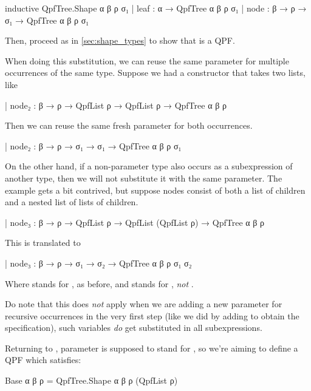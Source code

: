 \begin{leancode}
  inductive QpfTree.Shape α β ρ σ₁
    | leaf : α → QpfTree α β ρ σ₁
    | node : β → ρ → σ₁ → QpfTree α β ρ σ₁
\end{leancode}

Then, proceed as in \cref{sec:shape_types} to show that  is a QPF.\@

\begin{remark}
  When doing this substitution, we can reuse the same parameter for multiple occurrences of the same type.
  Suppose we had a constructor that takes two lists, like
  \begin{leancode}
    | node₂ : β → ρ → QpfList ρ → QpfList ρ → QpfTree α β ρ
  \end{leancode}
  Then we can reuse the same fresh parameter  for both occurrences.
  \begin{leancode}
    | node₂ : β → ρ → σ₁ → σ₁ → QpfTree α β ρ σ₁
  \end{leancode}
  
  On the other hand, if a non-parameter type also occurs as a subexpression of another type, then
  we will not substitute it with the same parameter.
  The example gets a bit contrived, but suppose nodes consist of both a list of children and a nested list 
  of lists of children.
  \begin{leancode}
    | node₃ : β → ρ → QpfList ρ → QpfList (QpfList ρ) → QpfTree α β ρ
  \end{leancode}
  This is translated to
  \begin{leancode}
    | node₃ : β → ρ → σ₁ → σ₂ → QpfTree α β ρ σ₁ σ₂
  \end{leancode}
  Where  stands for , as before, and  stands for , \emph{not} .    
  
  Do note that this does \emph{not} apply when we are adding a new parameter for recursive occurrences in the very first step (like we did by adding  to obtain the  specification), such variables \emph{do} get substituted in all subexpressions.
  \end{remark}

Returning to , parameter  is supposed to stand for , so we're aiming to define a QPF which satisfies:
\begin{leancode}
  Base α β ρ = QpfTree.Shape α β ρ (QpfList ρ)
\end{leancode}


